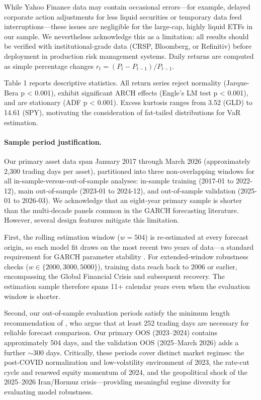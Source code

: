 While Yahoo Finance data may contain occasional errors---for example, delayed corporate action adjustments for less liquid securities or temporary data feed interruptions---these issues are negligible for the large-cap, highly liquid ETFs in our sample. We nevertheless acknowledge this as a limitation: all results should be verified with institutional-grade data (CRSP, Bloomberg, or Refinitiv) before deployment in production risk management systems. Daily returns are computed as simple percentage changes $r_t = (P_t - P_{t-1})/P_{t-1}$.

Table 1 reports descriptive statistics. All return series reject normality (Jarque-Bera p < 0.001), exhibit significant ARCH effects (Engle's LM test p < 0.001), and are stationary (ADF p < 0.001). Excess kurtosis ranges from 3.52 (GLD) to 14.61 (SPY), motivating the consideration of fat-tailed distributions for VaR estimation.

\paragraph{Sample period justification.} %
Our primary asset data span January 2017 through March 2026 (approximately 2,300 trading days per asset), partitioned into three non-overlapping windows for all in-sample-versus-out-of-sample analyses: in-sample training (2017-01 to 2022-12), main out-of-sample (2023-01 to 2024-12), and out-of-sample validation (2025-01 to 2026-03). We acknowledge that an eight-year primary sample is shorter than the multi-decade panels common in the GARCH forecasting literature. However, several design features mitigate this limitation.

First, the rolling estimation window ($w = 504$) is re-estimated at every forecast origin, so each model fit draws on the most recent two years of data---a standard requirement for GARCH parameter stability \citep{hwang2006}. For extended-window robustness checks ($w \in \{2000, 3000, 5000\}$), training data reach back to 2006 or earlier, encompassing the Global Financial Crisis and subsequent recovery. The estimation sample therefore spans 11+ calendar years even when the evaluation window is shorter.

Second, our out-of-sample evaluation periods satisfy the minimum length recommendation of \citet{hansen2005}, who argue that at least 252 trading days are necessary for reliable forecast comparison. Our primary OOS (2023--2024) contains approximately 504 days, and the validation OOS (2025--March 2026) adds a further $\sim$300 days. Critically, these periods cover distinct market regimes: the post-COVID normalization and low-volatility environment of 2023, the rate-cut cycle and renewed equity momentum of 2024, and the geopolitical shock of the 2025--2026 Iran/Hormuz crisis---providing meaningful regime diversity for evaluating model robustness.

